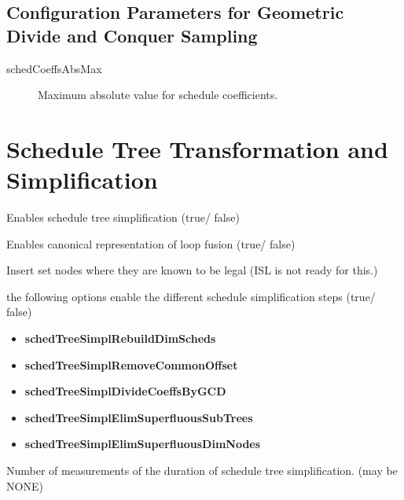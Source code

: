 \documentclass{article}
\begin{document}
\subsection{Configuration Parameters for Geometric Divide and Conquer Sampling}
\begin{description}
  \item[schedCoeffsAbsMax] Maximum absolute value for schedule coefficients.
\end{description}

\section{Schedule Tree Transformation and Simplification}
\begin{description}
  \item[simplifySchedTrees] Enables schedule tree simplification (true/ false)
  \item[splitLoopBodies] Enables canonical representation of loop fusion (true/
    false)
  \item[insertSetNodes] Insert set nodes where they are known to be legal (ISL
    is not ready for this.)

  \item the following options enable the different schedule simplification
    steps (true/ false)
  \begin{itemize}
  \item \textbf{schedTreeSimplRebuildDimScheds}
  \item \textbf{schedTreeSimplRemoveCommonOffset}
  \item \textbf{schedTreeSimplDivideCoeffsByGCD}
  \item \textbf{schedTreeSimplElimSuperfluousSubTrees}
  \item \textbf{schedTreeSimplElimSuperfluousDimNodes}
\end{itemize}
  \item[numSchedTreeSimplDurationMeasurements] Number of measurements of the
    duration of schedule tree simplification. (may be NONE)
\end{description}
\end{document}
